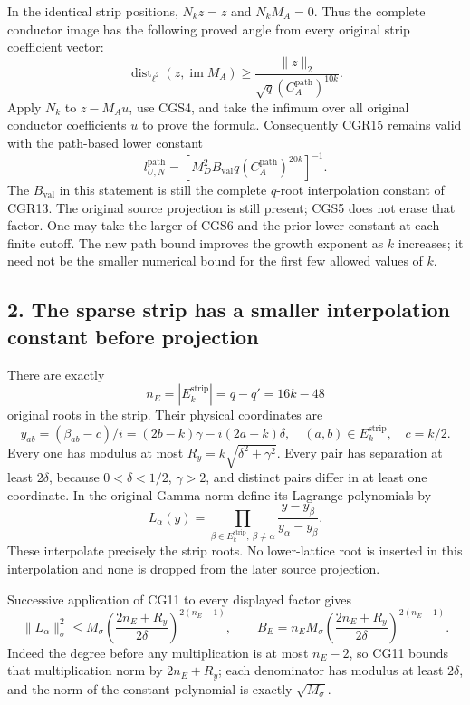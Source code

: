 \documentclass[11pt]{article}
\begin{document}
In the identical strip positions, \(N_kz=z\) and \(N_kM_A=0\). Thus the complete conductor image has the following proved angle from every original strip coefficient vector: \[
\boxed{\operatorname{dist}_{\ell^2}(z,\operatorname{im}M_A)
\ge\frac{\|z\|_2}{\sqrt q(C_A^{\mathrm{path}})^{10k}}.}
\tag{CGS5}
\] Apply \(N_k\) to \(z-M_Au\), use CGS4, and take the infimum over all original conductor coefficients \(u\) to prove the formula. Consequently CGR15 remains valid with the path-based lower constant \[
l_{U,N}^{\mathrm{path}}=
\left[M_D^2B_{\mathrm{val}}q
          (C_A^{\mathrm{path}})^{20k}\right]^{-1}.
\tag{CGS6}
\] The \(B_{\mathrm{val}}\) in this statement is still the complete \(q\)-root interpolation constant of CGR13. The original source projection is still present; CGS5 does not erase that factor. One may take the larger of CGS6 and the prior lower constant at each finite cutoff. The new path bound improves the growth exponent as \(k\) increases; it need not be the smaller numerical bound for the first few allowed values of \(k\).

\subsection{2. The sparse strip has a smaller interpolation constant before projection}\label{the-sparse-strip-has-a-smaller-interpolation-constant-before-projection}

There are exactly \[
n_E=|E_k^{\mathrm{strip}}|=q-q'=16k-48
\tag{CGS7}
\] original roots in the strip. Their physical coordinates are \[
y_{ab}=(\beta_{ab}-c)/i=(2b-k)\gamma-i(2a-k)\delta,
\quad (a,b)\in E_k^{\mathrm{strip}},\quad c=k/2.
\tag{CGS8}
\] Every one has modulus at most \(R_y=k\sqrt{\delta^2+\gamma^2}\). Every pair has separation at least \(2\delta\), because \(0<\delta<1/2\), \(\gamma>2\), and distinct pairs differ in at least one coordinate. In the original Gamma norm define its Lagrange polynomials by \[
L_\alpha(y)=\prod_{\beta\in E_k^{\mathrm{strip}},\ \beta\ne\alpha}
\frac{y-y_\beta}{y_\alpha-y_\beta}.
\tag{CGS9}
\] These interpolate precisely the strip roots. No lower-lattice root is inserted in this interpolation and none is dropped from the later source projection.

Successive application of CG11 to every displayed factor gives \[
\|L_\alpha\|_\sigma^2
\le M_\sigma\left(\frac{2n_E+R_y}{2\delta}\right)^{2(n_E-1)},
\qquad
B_E=n_EM_\sigma
\left(\frac{2n_E+R_y}{2\delta}\right)^{2(n_E-1)}.
\tag{CGS10}
\] Indeed the degree before any multiplication is at most \(n_E-2\), so CG11 bounds that multiplication norm by \(2n_E+R_y\); each denominator has modulus at least \(2\delta\), and the norm of the constant polynomial is exactly \(\sqrt{M_\sigma}\).
\end{document}
